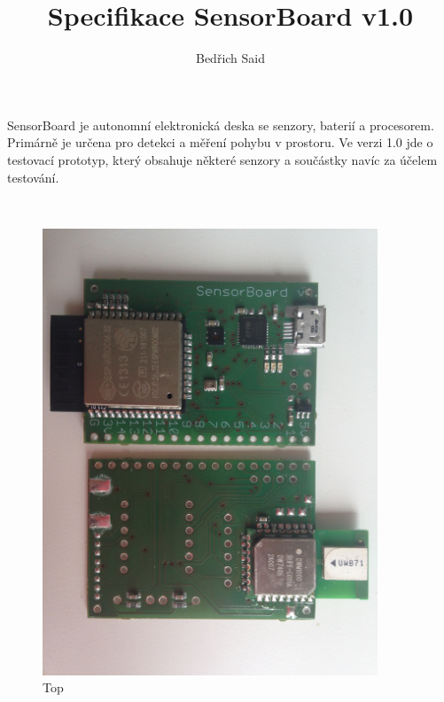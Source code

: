 \documentclass[12pt,a4paper]{article}
\author{Bedřich Said}
\title{Specifikace SensorBoard v1.0}
\begin{document}
\maketitle

SensorBoard je autonomní elektronická deska se senzory, baterií a procesorem. Primárně je určena pro detekci a měření pohybu v prostoru. Ve verzi 1.0 jde o testovací prototyp, který obsahuje některé senzory a součástky navíc za účelem testování.

\quad\\

\begin{figure}[h!]
  \centering
  \begin{minipage}{10cm}
    \includegraphics[width=10cm]{img/1.jpg}
    \\\centering Top
  \end{minipage}
  \begin{minipage}{10cm}

\end{minipage}
\end{figure}
\end{document}
